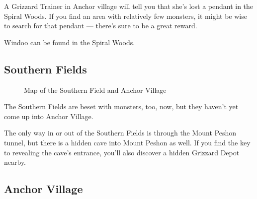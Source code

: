 \documentclass[10pt,twocolumn]{memoir}
\begin{document}
A Grizzard Trainer in Anchor village will  tell you that she's lost a pendant in
the Spiral Woods. If you find an  area with relatively few monsters, it might be
wise to search for that pendant --- there's sure to be a great reward.

Windoo can be found in the Spiral Woods.

\subsection{Southern Fields}

\begin{figure}[ht]
  \begin{center}
  \end{center}
  \caption{Map of the Southern Field and Anchor Village}
\end{figure}

The Southern Fields are beset with monsters, too, now, but they haven't yet come
up into Anchor Village.

The  only  way  in  or  out  of   the  Southern  Fields  is  through  the  Mount
Peshon tunnel, but there is a hidden cave into Mount Peshon as well. If you find
the key to revealing the cave's entrance, you'll also discover a hidden Grizzard
Depot nearby.

\subsection{Anchor Village}
\end{document}
